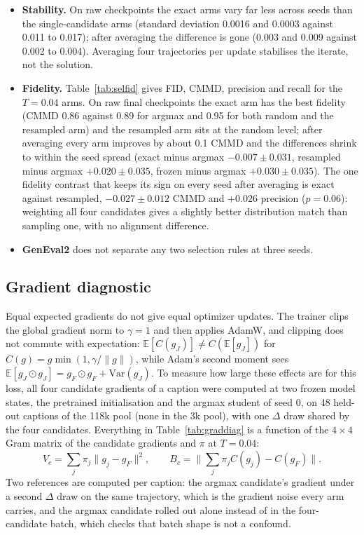 \documentclass[11pt,a4paper]{article}
\begin{document}
\begin{itemize}
\item \textbf{Stability.} On raw checkpoints the exact arms vary far less across seeds than the single-candidate arms (standard deviation 0.0016 and 0.0003 against 0.011 to 0.017); after averaging the difference is gone (0.003 and 0.009 against 0.002 to 0.004). Averaging four trajectories per update stabilises the iterate, not the solution.
\item \textbf{Fidelity.} Table~\ref{tab:selfid} gives FID, CMMD, precision and recall for the $T{=}0.04$ arms. On raw final checkpoints the exact arm has the best fidelity (CMMD 0.86 against 0.89 for argmax and 0.95 for both random and the resampled arm) and the resampled arm sits at the random level; after averaging every arm improves by about 0.1 CMMD and the differences shrink to within the seed spread (exact minus argmax $-0.007\pm0.031$, resampled minus argmax $+0.020\pm0.035$, frozen minus argmax $+0.030\pm0.035$). The one fidelity contrast that keeps its sign on every seed after averaging is exact against resampled, $-0.027\pm0.012$ CMMD and $+0.026$ precision ($p=0.06$): weighting all four candidates gives a slightly better distribution match than sampling one, with no alignment difference.
\item \textbf{GenEval2} does not separate any two selection rules at three seeds.
\end{itemize}

\subsection{Gradient diagnostic}
\label{sec:graddiag}
Equal expected gradients do not give equal optimizer updates. The trainer clips the global gradient norm to $\gamma=1$ and then applies AdamW, and clipping does not commute with expectation: $\mathbb{E}[C(g_J)]\neq C(\mathbb{E}[g_J])$ for $C(g)=g\min(1,\gamma/\lVert g\rVert)$, while Adam's second moment sees $\mathbb{E}[g_J\odot g_J]=g_F\odot g_F+\mathrm{Var}(g_J)$. To measure how large these effects are for this loss, all four candidate gradients of a caption were computed at two frozen model states, the pretrained initialisation and the argmax student of seed 0, on 48 held-out captions of the 118k pool (none in the 3k pool), with one $\Delta$ draw shared by the four candidates. Everything in Table~\ref{tab:graddiag} is a function of the $4\times4$ Gram matrix of the candidate gradients and $\pi$ at $T=0.04$:
\begin{equation}
V_c=\sum_j\pi_j\lVert g_j-g_F\rVert^2,\qquad
B_c=\Big\lVert\sum_j\pi_jC(g_j)-C(g_F)\Big\rVert .
\end{equation}
Two references are computed per caption: the argmax candidate's gradient under a second $\Delta$ draw on the same trajectory, which is the gradient noise every arm carries, and the argmax candidate rolled out alone instead of in the four-candidate batch, which checks that batch shape is not a confound.
\end{document}
